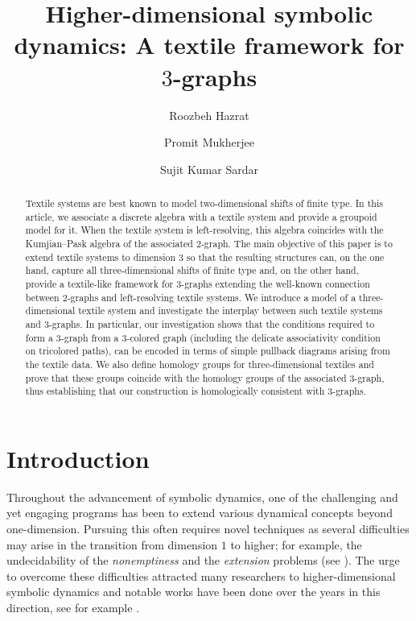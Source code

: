 \documentclass[a4paper,reqno,12pt]{amsart}
\title[A textile framework for $3$-graphs]{Higher-dimensional symbolic dynamics: A textile framework for $3$-graphs}
\author{Roozbeh Hazrat}
\author{Promit Mukherjee}
\author{Sujit Kumar Sardar}
\theoremstyle{definition}
\theoremstyle{remark}
\begin{document}
\begin{abstract}
Textile systems are best known to model two-dimensional shifts of finite type. In this article, we associate a discrete algebra with a textile system and provide a groupoid model for it. When the textile system is left-resolving, this algebra coincides with the Kumjian--Pask algebra of the associated $2$-graph. The main objective of this paper is to extend textile systems to dimension $3$ so that the resulting structures can, on the one hand, capture all three-dimensional shifts of finite type and, on the other hand, provide a textile-like framework for $3$-graphs extending the well-known connection between $2$-graphs and left-resolving textile systems. We introduce a model of a three-dimensional textile system and investigate the interplay between such textile systems and $3$-graphs. In particular, our investigation shows that the conditions required to form a $3$-graph from a $3$-colored graph (including the delicate associativity condition on tricolored paths), can be encoded in terms of simple pullback diagrams arising from the textile data. We also define homology groups for three-dimensional textiles and prove that these groups coincide with the homology groups of the associated $3$-graph, thus establishing that our construction is homologically consistent with $3$-graphs.  
\end{abstract}

\maketitle

\tableofcontents

\section{Introduction}\label{sec introduction}
Throughout the advancement of symbolic dynamics, one of the challenging and yet engaging programs has been to extend various dynamical concepts beyond one-dimension. Pursuing this often requires novel techniques as several difficulties may arise in the transition from dimension $1$ to higher; for example, the undecidability of the \emph{nonemptiness} and the \emph{extension} problems (see \cite{Lind-Marcus,JM}). The urge to overcome these difficulties attracted many researchers to higher-dimensional symbolic dynamics and notable works have been done over the years in this direction, see for example \cite{Aso, JM, JM2, Kitchens, MP, Quas-Trow, Schmidt}.
\end{document}
